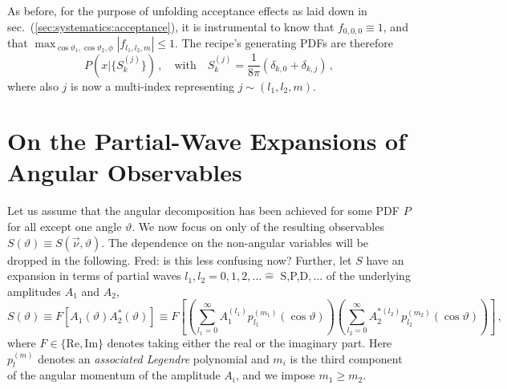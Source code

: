 \documentclass[aps,prd,reprint,nofootinbib,preprintnumbers]{revtex4}
\newcommand{\refsec}[1]{sec.~(\ref{sec:#1})}
\renewcommand{\theta}{\vartheta}
\newcommand{\danny}[1]{{\color{purple}#1}}
\begin{document}
As before, for the purpose of unfolding acceptance effects as laid down in \refsec{systematics:acceptance}, it is instrumental
to know that $f_{0,0,0} \equiv 1$, and that $\max_{\cos\theta_1,\cos\theta_2,\phi} |f_{l_1, l_2, m}| \leq 1$.
The recipe's generating PDFs are therefore
\begin{equation}
    P(x|\lbrace S_k^{(j)}\rbrace)\,,\quad\text{with}\quad S_k^{(j)} = \frac{1}{8\pi}\left(\delta_{k,0} + \delta_{k,j}\right)\,,
\end{equation}
where also $j$ is now a multi-index representing $j \sim (l_1, l_2, m)$.


\section{On the Partial-Wave Expansions of Angular Observables}
\label{app:partial-waves}

Let us assume that the angular decomposition has been achieved for some
PDF $P$ for all except one angle $\theta$. We now focus on only of the resulting
observables $S(\theta) \equiv S(\vec{\nu},\theta)$. The dependence on the non-angular
variables will be dropped in the following. \danny{Fred: is this less confusing now?}
Further, let $S$ have an expansion in terms of partial waves
$l_1, l_2 = 0,1,2,\dots \hat{=}$ S,P,D$,\dots$ of the underlying amplitudes $A_1$ and $A_2$,
\begin{equation}
    \label{eq:def-partial-wave-observable}
    S(\theta) \equiv F\left[A_1(\theta) A_2^*(\theta)\right] \equiv F\left[\left(\sum_{l_1=0}^\infty A_1^{(l_1)} p_{l_1}^{(m_1)}(\cos\theta)\right) \left(\sum_{l_2=0}^\infty A_2^{*(l_2)} p_{l_2}^{(m_2)}(\cos\theta)\right)\right]\,,
\end{equation}
where $F \in \{\text{Re},\text{Im}\}$ denotes taking either the real
or the imaginary part. Here $p_{l}^{(m)}$ denotes an \emph{associated Legendre} polynomial and $m_i$ is the third component of the angular momentum of the amplitude $A_i$, and we impose $m_1 \geq m_2$.\\
\end{document}
